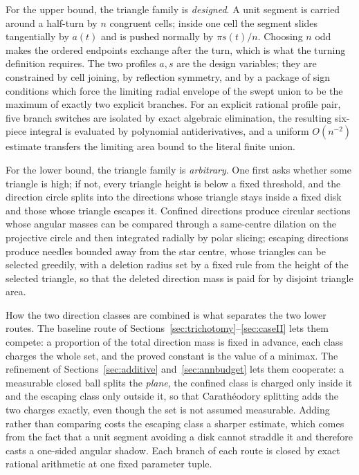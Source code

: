 \documentclass[11pt]{article}
\theoremstyle{plain}
\theoremstyle{definition}
\theoremstyle{remark}
\begin{document}
For the upper bound, the triangle family is \emph{designed}. A unit segment is
carried around a half-turn by $n$ congruent cells; inside one cell the segment
slides tangentially by $a(t)$ and is pushed normally by $\pi s(t)/n$. Choosing
$n$ odd makes the ordered endpoints exchange after the turn, which is what the
turning definition requires. The two profiles $a,s$ are the design variables;
they are constrained by cell joining, by reflection symmetry, and by a package
of sign conditions which force the limiting radial envelope of the swept union
to be the maximum of exactly two explicit branches. For an explicit rational
profile pair, five branch switches are isolated by exact algebraic elimination,
the resulting six-piece integral is evaluated by polynomial antiderivatives, and
a uniform $O(n^{-2})$ estimate transfers the limiting area bound to the literal
finite union.

For the lower bound, the triangle family is \emph{arbitrary}. One first asks
whether some triangle is high; if not, every triangle height is below a fixed
threshold, and the direction circle splits into the directions whose triangle
stays inside a fixed disk and those whose triangle escapes it. Confined
directions produce circular sections whose angular masses can be compared
through a same-centre dilation on the projective circle and then integrated
radially by polar slicing; escaping directions produce needles bounded away from
the star centre, whose triangles can be selected greedily, with a deletion
radius set by a fixed rule from the height of the selected triangle, so that the
deleted direction mass is paid for by disjoint triangle area.

How the two direction classes are combined is what separates the two lower
routes. The baseline route of
Sections~\ref{sec:trichotomy}--\ref{sec:caseII} lets them compete: a
proportion of the total direction mass is fixed in advance, each class charges
the whole set, and the proved constant is the value of a minimax. The
refinement of Sections~\ref{sec:additive} and~\ref{sec:annbudget} lets them
cooperate: a measurable closed ball splits the \emph{plane}, the confined class
is charged only inside it and the escaping class only outside it, so that
Carath\'eodory splitting adds the two charges exactly, even though the set is
not assumed measurable. Adding rather than comparing costs the escaping class a
sharper estimate, which comes from the fact that a unit segment avoiding a disk
cannot straddle it and therefore casts a one-sided angular shadow. Each branch
of each route is closed by exact rational arithmetic at one fixed parameter
tuple.
\end{document}

